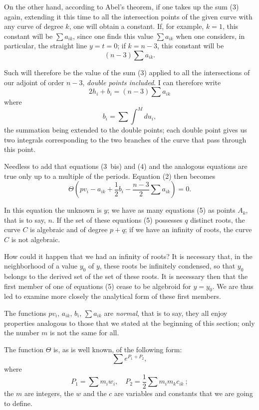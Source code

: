 \documentclass{article}
\begin{document}
On the other hand, according to Abel's theorem, if one takes up the sum (3) again, extending it this time to all the intersection points of the given curve with any curve of degree $k$, one will obtain a constant. If, for example, $k = 1$, this constant will be $\displaystyle\sum a_{ik}$, since one finds this value $\displaystyle\sum a_{ik}$ when one considers, in particular, the straight line $y = t = 0$; if $k = n - 3$, this constant will be
\[
(n - 3) \sum a_{ik}.
\]

Such will therefore be the value of the sum (3) applied to all the intersections of our adjoint of order $n - 3$, \emph{double points included}. I can therefore write
\[
2 h_{i} + b_{i} = (n - 3) \sum a_{ik} \tag{4}
\]
where
\[
b_{i} = \sum \int^{M} du_{i},
\]
the summation being extended to the double points; each double point gives us two integrals corresponding to the two branches of the curve that pass through this point.

Needless to add that equations (3~bis) and (4) and the analogous equations are true only up to a multiple of the periods. Equation
(2) then becomes
\[
\Theta\left( p v_{i} - a_{ik} + \frac{1}{2} b_{i} - \frac{n - 3}{2} \sum a_{ik} \right) = 0. \tag{5}
\]

In this equation the unknown is $y$; we have as many equations (5) as points $A_{k}$, that is to say, $n$. If the set of these equations (5) possesses $q$ distinct roots, the curve $C$ is algebraic and of degree $p + q$; if we have an infinity of roots, the curve $C$ is not algebraic.

How could it happen that we had an infinity of roots? It is necessary that, in the neighborhood of a value $y_{0}$ of $y$, these roots be infinitely condensed, so that $y_{0}$ belongs to the derived set of the set of these roots. It is necessary then that the first member of one of equations (5) cease to be algebroid for $y = y_{0}$. We are thus led to examine more closely the analytical form of these first members.

The functions $p v_{i}$, $a_{ik}$, $b_{i}$, $\displaystyle\sum a_{ik}$ are \emph{normal}, that is to say, they all enjoy properties analogous to those that we stated at the beginning of this section; only the number $m$ is not the same for all.

The function $\Theta$ is, as is well known, of the following form:
\[
\sum e^{P_{1} + P_{2}},
\]
where
\[
P_{1} = \sum m_{i} w_{i}, \quad P_{2} = \frac{1}{2} \sum m_{i} m_{k} c_{ik}~;
\]
the $m$ are integers, the $w$ and the $c$ are variables and constants that we are going to define.
\end{document}
